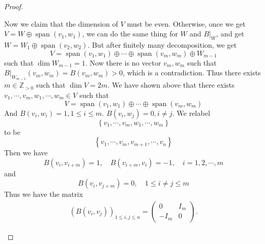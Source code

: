 \documentclass[../main.tex]{subfiles}
\begin{document}
\begin{proof}
\begin{enumerate}
          Now we claim that the dimension of \(  V  \) must be even. Otherwise, once we get \(  V= W\oplus \operatorname{span}\left( v_1,w_1 \right)   \), we can do the same thing for \(  W  \) and \(  B|_{W}  \), and  get \(  W= W_1\oplus \operatorname{span}\left( v_2,w_2 \right)   \). But after finitely many decomposition, we get  \[
          V= \operatorname{span}\left( v_1,w_1 \right)\oplus \cdots \oplus \operatorname{span}\left( v_{m},w_{m} \right)\oplus W_{m-1}  
          \]    such that \(  \operatorname{dim}W_{m-1} = 1  \). Now there is no vector \(  v_{m},w_{m}   \) such that \(  B|_{W_{m-1}}\left( v_{m},w_{m} \right)= B\left( v_{m},w_{m} \right)> 0    \),   which is a contradiction. Thus there exists \(  m \in \mathbb{Z} _{> 0}   \) such that  \(  \operatorname{dim}V= 2m  \). We have shown above that there exists \(  v_1,\cdots ,v_{m}, w_1,\cdots ,w_{m} \in V  \) such that \[
          V= \operatorname{span}\left( v_1,w_1 \right)\oplus \cdots \oplus \operatorname{span}\left( v_{m},w_{m} \right)  
          \]   And \(  B\left( v_i,w_{i} \right)= 1,  1\le i\le m   \).  \(  B\left( v_{i},w_{j} \right)= 0, i\neq j   \).  We relabel \[
          \left\{v_1,\cdots ,v_{m} ,w_1,\cdots ,w_{m} \right\}
          \] to be \[
          \left\{ v_1,\cdots ,v_{m},v_{m+ 1},\cdots ,v_{n} \right\}
          \]Then we have \[
          B\left( v_{i},v_{i+ m} \right)= 1,\quad B\left( v_{i+ m},v_{i} \right)= -1  ,\quad i = 1,2,\cdots ,m
          \] and  \[
          B\left( v_{i},v_{j + m} \right) = 0,\quad  1\le i\neq j\le m
          \]Thus we have the  matrix
\[\begin{aligned}
(B(v_i, v_j))_{1 \le i, j \le n} = \begin{pmatrix} 0 & I_m \\ -I_m & 0 \end{pmatrix}.
\end{aligned}\]
     \end{enumerate}
     

\end{proof}
\end{document}
